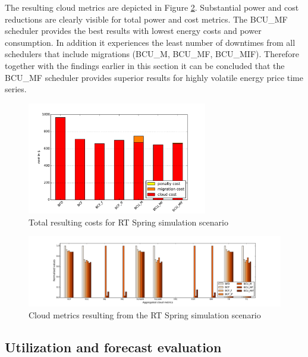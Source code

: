 The resulting cloud metrics are depicted in Figure \ref{fig:RT_Spring_cloud_metrics}. Substantial power and cost reductions are clearly visible for total power and cost metrics. The BCU\_MF scheduler provides the best results with lowest energy costs and power consumption. In addition it experiences the least number of downtimes from all schedulers that include migrations (BCU\_M, BCU\_MF, BCU\_MIF). Therefore together with the findings earlier in this section it can be concluded that the BCU\_MF scheduler provides superior results for highly volatile energy price time series. 

\begin{figure}[htbp]
	\centering
		\includegraphics[width=0.7\textwidth]{figures/evaluation_and_results/RT_Spring_total_cost.pdf}
	\caption{Total resulting costs for RT Spring simulation scenario}
	\label{fig:RT_Spring_total_cost}
\end{figure}

\begin{figure}[htbp]
	\centering
	\hspace*{-1.2in}
		\includegraphics[width=1.50\textwidth]{figures/evaluation_and_results/RT_Spring_cloud_metrics.pdf}
	\caption{Cloud metrics resulting from the RT Spring simulation scenario}
	\label{fig:RT_Spring_cloud_metrics}
\end{figure}





\subsection{Utilization and forecast evaluation}

